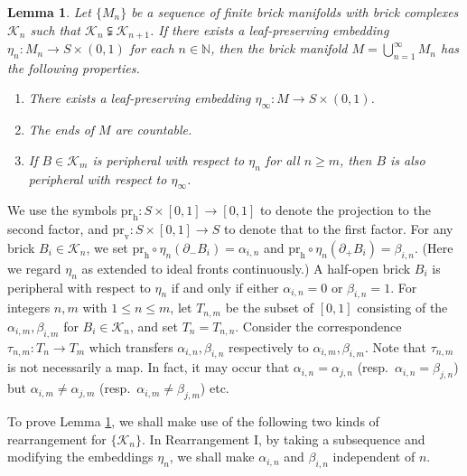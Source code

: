 \documentclass{amsart}
\newtheorem{lemma}[theorem]{Lemma}
\theoremstyle{definition}
\numberwithin{figure}{section}
\numberwithin{equation}{section}
\newcommand{\blackboard}[1]{\ensuremath{\mathbb{#1}}}
\newcommand{\naturals}{\blackboard{N}}
\newcommand{\pr}{\mathrm{pr}}
\def\v{\mathrm{v}}
\def\nn{\naturals}
\def\ck{\mathcal{K}}
\def\part{\partial}
\begin{document}
\begin{lemma}\label{l_21}
Let $\{M_n\}$ be a sequence of finite brick manifolds with   brick complexes $\ck_n$ such that $\ck_n\subsetneqq \ck_{n+1}$.
If there exists a leaf-preserving embedding $\eta_n:M_n\rightarrow S\times (0,1)$ for each $n\in \nn$, then 
the brick manifold $M =\bigcup_{n=1}^\infty M_n$ has the following properties.
\begin{enumerate}[\rm (i)]
\item
There exists a leaf-preserving embedding $\eta_\infty:M\rightarrow S\times (0,1)$.
\item
The ends of $M$ are countable.
\item
If $B\in \ck_m$ is peripheral with respect to $\eta_n$ for all $n\geq m$, then 
$B$ is also peripheral with respect to $\eta_\infty$.
\end{enumerate}
\end{lemma}




We use the symbols $\pr_\mathrm{h}: S \times [0,1] \rightarrow [0,1]$ to denote the projection to the second factor, and $\pr_\v: S \times [0,1] \rightarrow S$ to denote that to the first factor.
For any brick $B_i \in \ck_n$, we set $\pr_\mathrm{h} \circ \eta_n(\part_-B_i)=\alpha_{i,n}$ and $\pr_\mathrm{h} \circ\eta_n(\part_+B_i)=\beta_{i,n}$.
(Here we regard $\eta_n$ as extended to ideal fronts continuously.)
A half-open brick $B_i$ is peripheral with respect to $\eta_n$ if and only if either $\alpha_{i,n}=0$ or $\beta_{i,n}=1$.
For integers $n,m$ with $1\leq n\leq m$, let $T_{n,m}$ be the subset of $[0,1]$ consisting of the $\alpha_{i,m}, \beta_{i,m}$ for $B_i\in \ck_n$, and set $T_n=T_{n,n}$.
Consider the correspondence 
$\tau_{n,m}:T_{n}\rightarrow T_{m}$ which transfers $\alpha_{i,n},\beta_{i,n}$ respectively to $\alpha_{i,m},\beta_{i,m}$.
Note that $\tau_{n,m}$ is not necessarily a map.
In fact, it may occur that  $\alpha_{i,n}=\alpha_{j,n}$ (resp.\ $\alpha_{i,n}=\beta_{j,n}$) but $\alpha_{i,m}\neq \alpha_{j,m}$ (resp.\ $\alpha_{i,m}\neq \beta_{j,m}$) etc.

To prove Lemma \ref{l_21}, we shall make use of  the following two kinds of rearrangement for $\{\ck_n\}$.
In Rearrangement I, by taking a subsequence and modifying the embeddings $\eta_n$, we shall make $\alpha_{i,n}$ and $\beta_{i,n}$ independent of $n$.
\end{document}
